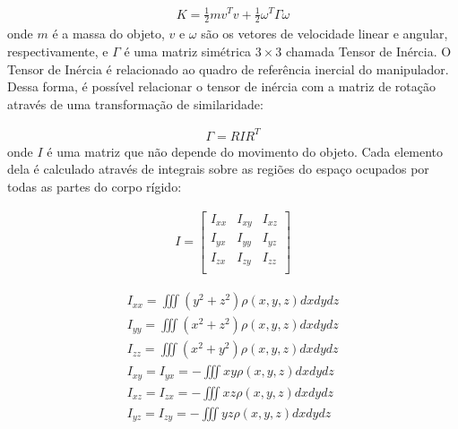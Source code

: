 \begin{equation}
  \begin{gathered}
    K=\frac{1}{2}mv^Tv+\frac{1}{2}\omega^T\Gamma \omega
  \end{gathered}
  \label{eq:energiaCinetica}
\end{equation}
onde $m$ é a massa do objeto, $v$ e $\omega$ são os vetores de velocidade 
linear e angular, respectivamente, e $\Gamma$ é uma matriz simétrica $3 \times 3$ 
chamada Tensor de Inércia. O Tensor de Inércia é relacionado ao quadro de 
referência inercial do manipulador. Dessa forma, é possível 
relacionar o tensor de inércia com a matriz de rotação através de uma 
transformação de similaridade:

\begin{equation}
  \begin{gathered}
    \Gamma = RIR^T
  \end{gathered}
  \label{eq:ts}
\end{equation}
onde $I$ é uma matriz que não depende do movimento do 
objeto. Cada elemento dela é calculado através de integrais sobre as
regiões do espaço ocupados por todas as partes do corpo rígido:

\begin{equation}
  \begin{gathered}
    I = \begin{bmatrix}
     I_{xx} & I_{xy} & I_{xz}\\
     I_{yx} & I_{yy} & I_{yz}\\
     I_{zx} & I_{zy} & I_{zz}\\
    \end{bmatrix}
  \end{gathered}
\end{equation}

\begin{equation}
  \begin{gathered}
    I_{xx} = \iiint(y^2+z^2)\rho(x,y,z)dxdydz\\
    I_{yy} = \iiint(x^2+z^2)\rho(x,y,z)dxdydz\\
    I_{zz} = \iiint(x^2+y^2)\rho(x,y,z)dxdydz\\
    I_{xy} = I_{yx} = - \iiint xy\rho(x,y,z)dxdydz\\
    I_{xz} = I_{zx} = - \iiint xz\rho(x,y,z)dxdydz\\
    I_{yz} = I_{zy} = - \iiint yz\rho(x,y,z)dxdydz\\
  \end{gathered}
\end{equation}

